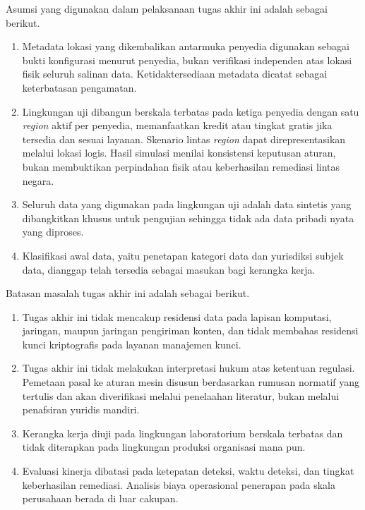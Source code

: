 Asumsi yang digunakan dalam pelaksanaan tugas akhir ini adalah sebagai berikut.

\begin{enumerate}

\item Metadata lokasi yang dikembalikan antarmuka penyedia digunakan sebagai bukti konfigurasi menurut penyedia, bukan verifikasi independen atas lokasi fisik seluruh salinan data. Ketidaktersediaan metadata dicatat sebagai keterbatasan pengamatan.

\item Lingkungan uji dibangun berskala terbatas pada ketiga penyedia dengan satu \textit{region} aktif per penyedia, memanfaatkan kredit atau tingkat gratis jika tersedia dan sesuai layanan. Skenario lintas \textit{region} dapat direpresentasikan melalui lokasi logis. Hasil simulasi menilai konsistensi keputusan aturan, bukan membuktikan perpindahan fisik atau keberhasilan remediasi lintas negara.

\item Seluruh data yang digunakan pada lingkungan uji adalah data sintetis yang dibangkitkan khusus untuk pengujian sehingga tidak ada data pribadi nyata yang diproses.

\item Klasifikasi awal data, yaitu penetapan kategori data dan yurisdiksi subjek data, dianggap telah tersedia sebagai masukan bagi kerangka kerja.

\end{enumerate}

Batasan masalah tugas akhir ini adalah sebagai berikut.

\begin{enumerate}

\item Tugas akhir ini tidak mencakup residensi data pada lapisan komputasi, jaringan, maupun jaringan pengiriman konten, dan tidak membahas residensi kunci kriptografis pada layanan manajemen kunci.

\item Tugas akhir ini tidak melakukan interpretasi hukum atas ketentuan regulasi. Pemetaan pasal ke aturan mesin disusun berdasarkan rumusan normatif yang tertulis dan akan diverifikasi melalui penelaahan literatur, bukan melalui penafsiran yuridis mandiri.

\item Kerangka kerja diuji pada lingkungan laboratorium berskala terbatas dan tidak diterapkan pada lingkungan produksi organisasi mana pun.

\item Evaluasi kinerja dibatasi pada ketepatan deteksi, waktu deteksi, dan tingkat keberhasilan remediasi. Analisis biaya operasional penerapan pada skala perusahaan berada di luar cakupan.

\end{enumerate}


